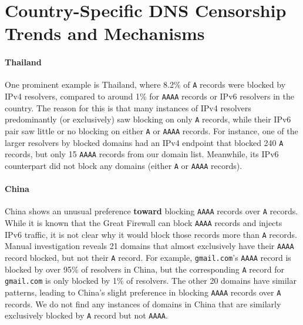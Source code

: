 \section{Country-Specific DNS Censorship Trends and Mechanisms}
\label{sec:cases}

\paragraph{Thailand} One prominent example is Thailand, where 8.2\% of
\texttt{A} records were blocked by IPv4 resolvers, compared to around 1\% for
\texttt{AAAA} records or IPv6 resolvers in the country. The reason for this is
that many instances of IPv4 resolvers predominantly (or exclusively) saw
blocking on only \texttt{A} records, while their IPv6 pair saw little or no
blocking on either \texttt{A} or \texttt{AAAA} records. For instance, one of the
larger resolvers by blocked domains had an IPv4 endpoint that blocked
240 \texttt{A} records, but only 15 \texttt{AAAA} records from our domain list.
Meanwhile, its IPv6 counterpart did not block any domains (either \texttt{A} or
\texttt{AAAA} records).





\paragraph{China}
China shows an unusual preference \textbf{toward} blocking \texttt{AAAA}
records over \texttt{A} records. While it is known that the Great Firewall
can block \texttt{AAAA} records and injects IPv6 traffic, it is not clear why it
would block those records more than \texttt{A} records. Manual investigation reveals
21 domains that almost exclusively have their \texttt{AAAA} record blocked, but
not their \texttt{A} record. For example, \texttt{gmail.com}'s \texttt{AAAA}
record is blocked by over 95\% of resolvers in China, but the corresponding
\texttt{A} record for \texttt{gmail.com} is only blocked by 1\% of resolvers.
The other 20 domains have similar patterns, leading to China's slight preference
in blocking \texttt{AAAA} records over \texttt{A} records. We do not find any
instances of domains in China that are similarly exclusively blocked by
\texttt{A} record but not \texttt{AAAA}.


